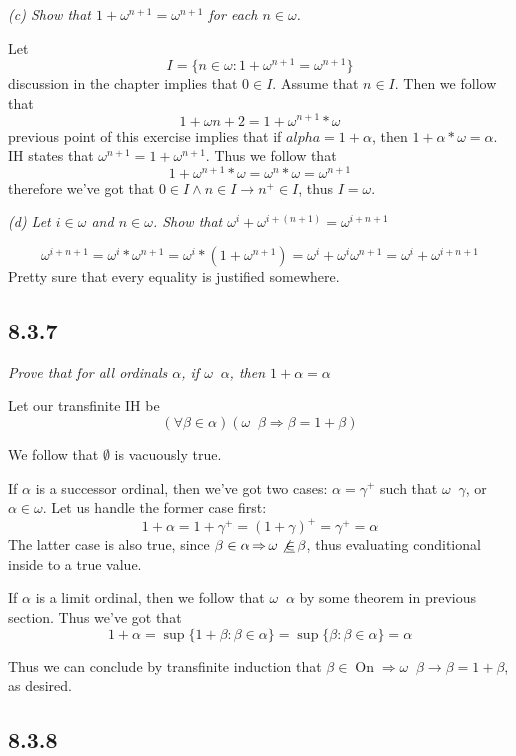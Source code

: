 \documentclass[11pt,oneside,titlepage]{book}
\DeclareMathOperator \ra {\Rightarrow}
\DeclareMathOperator \On {On}
\DeclareMathOperator \ineq {\underline{\in}}
\newcommand{\set}[1]{\{ #1 \}}
\begin{document}
\textit{(c) Show that $1 + \omega^{n + 1} = \omega^{n + 1}$ for each $n \in \omega$.}

Let
$$I = \set{n \in \omega: 1 + \omega^{n + 1} = \omega^{n + 1}}$$
discussion in the chapter implies that $0 \in I$. Assume that $n \in I$. Then we follow that
$$1 + \omega{n + 2} = 1 + \omega^{n  + 1} * \omega$$
previous point of this exercise implies that if $alpha = 1 + \alpha$, then
$1 + \alpha * \omega = \alpha$. IH states that $\omega^{n + 1} = 1 + \omega^{n + 1}$.
Thus we follow that
$$1 + \omega^{n + 1}  * \omega = \omega^n * \omega = \omega^{n + 1}$$
therefore we've got that $0 \in  I \land n \in I \to n^+ \in I$, thus $I = \omega$.

\textit{(d) Let $i \in \omega$ and $n \in \omega$. Show that
  $\omega^i + \omega^{i + (n + 1)} = \omega^{i + n + 1}$}

$$\omega^{i + n + 1} = \omega^i * \omega^{n + 1} = \omega^i * (1 + \omega^{n + 1}) =
\omega^i + \omega^i \omega^{n + 1} = \omega^i +  \omega^{i + n + 1}$$
Pretty sure that every equality is justified somewhere.

\subsection*{8.3.7}

\textit{Prove that for all ordinals $\alpha$, if $\omega \ineq \alpha$,
  then $1 + \alpha = \alpha$}

Let our transfinite IH be
$$(\forall \beta \in \alpha)(\omega \ineq \beta \ra \beta = 1 + \beta)$$

We follow that $\emptyset$ is vacuously true.

If $\alpha$ is a successor ordinal, then we've got two cases: $\alpha = \gamma^+$ such that
$\omega \ineq \gamma$, or $\alpha \in \omega$. Let us handle the former case first:  
$$1 + \alpha = 1 + \gamma^+ = (1 + \gamma)^+ = \gamma^+ = \alpha$$
The latter case is also true, since $\beta \in \alpha \ra \omega \not \ineq \beta$,
thus evaluating conditional inside to a true value.

If $\alpha$ is a limit ordinal, then we follow that $\omega \ineq \alpha$ by
some theorem in previous section. Thus we've got that 
$$1 + \alpha = \sup\set{1 + \beta: \beta \in \alpha} = \sup\set{\beta: \beta \in \alpha} =
\alpha$$

Thus we can conclude by transfinite induction that $\beta \in \On \ra \omega \ineq \beta \to
\beta = 1 + \beta$, as desired.

\subsection*{8.3.8}
\end{document}
